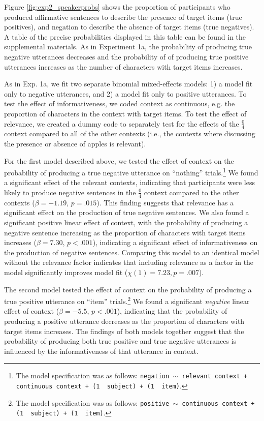 \documentclass[man, floatsintext, noapacite]{apa6}
\begin{document}
Figure \ref{fig:exp2_speakerprobs} shows the proportion of participants who produced affirmative sentences to describe the presence of target items (true positives), and negation to describe the absence of target items (true negatives). A table of the precise probabilities displayed in this table can be found in the supplemental materials. As in Experiment 1a, the probability of producing true negative utterances decreases and the probability of of producing true positive utterances increases as the number of characters with target items increases.

As in Exp. 1a, we fit two separate binomial mixed-effects models: 1) a model fit only to negative utterances, and 2) a model fit only to positive utterances. To test the effect of informativeness, we coded context as continuous, e.g. the proportion of characters in the context with target items. To test the effect of relevance, we created a dummy code to separately test for the effects of the  $\frac{0}{4}$ context compared to all of the other contexts (i.e., the contexts where discussing the presence or absence of apples is relevant). 

For the first model described above, we tested the effect of context on the probability of producing a true negative utterance on ``nothing'' trials.\footnote{The model specification was as follows: \texttt{negation $\sim$  relevant context + continuous context + (1~\textbar~subject) +  (1~\textbar~item)}.} We  found a significant effect of the relevant contexts, indicating that participants were less likely to produce negative sentences in the $\frac{0}{4}$ context compared to the other contexts ($\beta= -1.19$, $p = .015$). This finding suggests that relevance has a significant effect on the production of true negative sentences. We also found a significant positive linear effect of context, with the probability of producing a negative sentence increasing as the proportion of characters with target items increases ($\beta= 7.30$, $p< .001$), indicating a significant effect of informativeness on the production of negative sentences. Comparing this model to an identical model without the relevance factor indicates that including relevance as a factor in the model significantly improves model fit ($\chi(1)= 7.23, p = .007$). 

The second model tested the effect of context on the probability of producing a true positive utterance on ``item'' trials.\footnote{The model specification was as follows: \texttt{positive $\sim$  continuous context + (1~\textbar~subject) +  (1~\textbar~item)}.} We found a significant \textit{negative} linear effect of context ($\beta= -5.5$, $p< .001$), indicating that the probability of producing a positive utterance decreases as the proportion of characters with target items increases. The findings of both models together suggest that the probability of producing both true positive and true negative utterances is influenced by the informativeness of that utterance in context.
\end{document}
